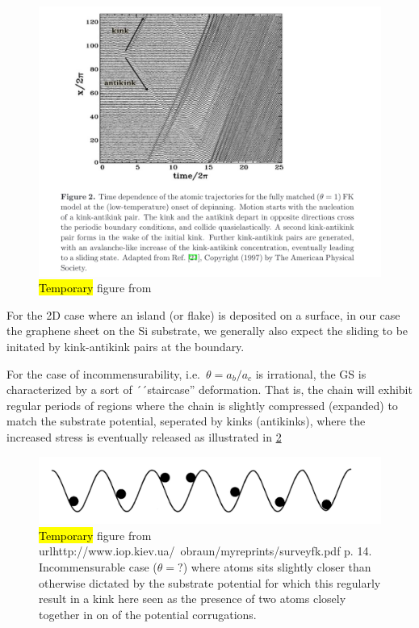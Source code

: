 \begin{figure}[H]
  \centering
  \includegraphics[width=0.8\linewidth]{figures/theory/kink_antikink.png}
  \caption{\hl{Temporary} figure from \cite{Manini_2016}}
  \label{fig:kink_antikink}
\end{figure}

For the 2D case where an island (or flake) is deposited on a surface, in our case the graphene sheet on the Si substrate, we generally also expect the sliding to be initated by kink-antikink pairs at the boundary. 

For the case of incommensurability, i.e.\ $\theta = a_b/a_c$ is irrational, the
\acrshort{GS} is characterized by a sort of ´´staircase'' deformation. That is, the chain will exhibit regular periods of regions where the chain is slightly compressed
(expanded) to match the substrate potential, seperated by kinks (antikinks),
where the increased stress is eventually released 
as illustrated in \cref{fig:incommensurable_example} 

\begin{figure}[H]
  \centering
  \includegraphics[width=0.5\linewidth]{figures/theory/incommensurable_example.png}
  \caption{\hl{Temporary} figure from
  url{http://www.iop.kiev.ua/~obraun/myreprints/surveyfk.pdf} p. 14.
  Incommensurable case ($\theta = ?$) where atoms sits slightly closer than
  otherwise dictated by the substrate potential for which this regularly result
  in a kink here seen as the presence of two atoms closely together in on of the
  potential corrugations.}
  \label{fig:incommensurable_example}
\end{figure}

